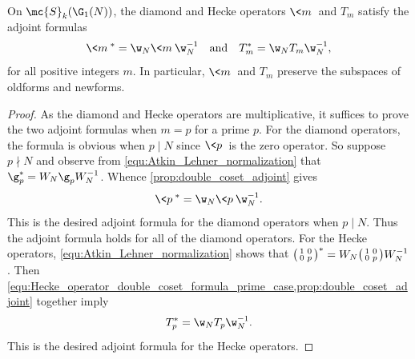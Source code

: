 \documentclass[12pt]{article}
\begin{document}
      \begin{proposition}\label{prop:Atkin_Lehner_adjoint_invariant_diamond_Hecke_modular}
        On \(\mc{S}_{k}(\G_{1}(N))\), the diamond and Hecke operators \(\<m\>\) and \(T_{m}\) satisfy the adjoint formulas
        \[
          \<m\>^{\ast} = \w_{N}\<m\>\w_{N}^{-1} \quad \text{and} \quad T_{m}^{\ast} = \w_{N}T_{m}\w_{N}^{-1},
        \]
        for all positive integers \(m\). In particular, \(\<m\>\) and \(T_{m}\) preserve the subspaces of oldforms and newforms.
      \end{proposition}
      \begin{proof}
        As the diamond and Hecke operators are multiplicative, it suffices to prove the two adjoint formulas when \(m = p\) for a prime \(p\). For the diamond operators, the formula is obvious when \(p \mid N\) since \(\<p\>\) is the zero operator. So suppose \(p \nmid N\) and observe from \cref{equ:Atkin_Lehner_normalization} that \(\g_{p}^{\ast} = W_{N}\g_{p}W_{N}^{-1}\). Whence \cref{prop:double_coset_adjoint} gives
        \[
          \<p\>^{\ast} = \w_{N}\<p\>\w_{N}^{-1}.
        \]
        This is the desired adjoint formula for the diamond operators when \(p \mid N\). Thus the adjoint formula holds for all of the diamond operators. For the Hecke operators, \cref{equ:Atkin_Lehner_normalization} shows that \(\begin{psmallmatrix}1 & 0 \\ 0 & p\end{psmallmatrix}^{\ast} = W_{N}\begin{psmallmatrix}1 & 0 \\ 0 & p\end{psmallmatrix}W_{N}^{-1}\). Then \cref{equ:Hecke_operator_double_coset_formula_prime_case,prop:double_coset_adjoint} together imply
        \[
          T_{p}^{\ast} = \w_{N}T_{p}\w_{N}^{-1}.
        \]
        This is the desired adjoint formula for the Hecke operators.


\end{proof}
\end{document}
